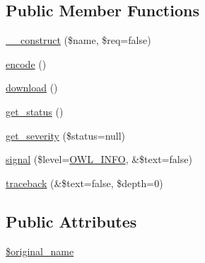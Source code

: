 \subsection*{Public Member Functions}
\begin{DoxyCompactItemize}
\item 
\hyperlink{classImageHandler_aa61dc81d4cf98eed31b32e2197018309}{\_\-\_\-construct} (\$name, \$req=false)
\item 
\hyperlink{classFileHandler_aa29360bf94fd54d906256561f33d93ad}{encode} ()
\item 
\hyperlink{classFileHandler_ac17edc9b92643c32ae6040b1235c64dd}{download} ()
\item 
\hyperlink{class__OWL_a99ec771fa2c5c279f80152cc09e489a8}{get\_\-status} ()
\item 
\hyperlink{class__OWL_adf9509ef96858be7bdd9414c5ef129aa}{get\_\-severity} (\$status=null)
\item 
\hyperlink{class__OWL_a51ba4a16409acf2a2f61f286939091a5}{signal} (\$level=\hyperlink{owl_8severitycodes_8php_a139328861128689f2f4def6a399d9057}{OWL\_\-INFO}, \&\$text=false)
\item 
\hyperlink{class__OWL_aa29547995d6741b7d2b90c1d4ea99a13}{traceback} (\&\$text=false, \$depth=0)
\end{DoxyCompactItemize}
\subsection*{Public Attributes}
\begin{DoxyCompactItemize}
\item 
\hyperlink{classImageHandler_a1712c9444d65879aab111260767afaab}{\$original\_\-name}
\end{DoxyCompactItemize}
